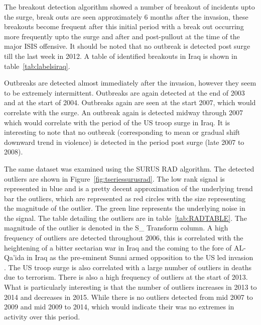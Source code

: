 The breakout detection algorithm showed a number of  breakout of incidents upto the surge, break outs are seen approximately 6 months after the invasion, these breakouts become frequent after this initial period with a break out occurring more frequently upto the surge and after and post-pullout at the time of the major ISIS offensive. It should be noted that no outbreak is detected post surge till the last week in 2012. A table of identified breakouts in Iraq is shown in table~\ref{tab:labelsiraq}. 

Outbreaks are detected almost immediately after the invasion, however they seem to be extremely intermittent. Outbreaks are again detected at the end of 2003 and at the start of 2004. Outbreaks again are seen at the start 2007, which would correlate with the surge. An outbreak again is detected midway through 2007 which would correlate with the period of the US troop surge in Iraq. It is interesting to note that no outbreak (corresponding to mean or gradual shift downward trend in violence) is detected in the period post surge (late 2007 to 2008). 

The same dataset was examined using the SURUS RAD algorithm. The detected outliers are shown in Figure~\ref{fig:tseriessurusrad}. The low rank signal is represented in blue and is a pretty decent approximation of the underlying trend bar the outliers, which are represented as red circles with the size representing the magnitude of the outlier. The green line represents the underlying noise in the signal. The table detailing the outliers are in table~\ref{tab:RADTABLE}. The magnitude of the outlier is denoted in the S\_ Transform column. A high frequency of outliers are detected throughout 2006, this is correlated with the heightening of a bitter sectarian war in Iraq and the coming to the fore of AL-Qa'ida in Iraq as the pre-eminent Sunni armed opposition to the US led invasion \citep{fearon2007iraq}. The US troop surge \citep{ricks2009gamble} is also correlated with a large number of outliers in deaths due to terrorism. There is also a high frequency of outliers at the start of 2013. What is particularly interesting is that the number of   outliers increases in 2013 to 2014 and decreases in 2015.  While there is no outliers detected from mid 2007 to 2009 and mid 2009 to 2014, which would indicate their was no extremes in activity over this period.


